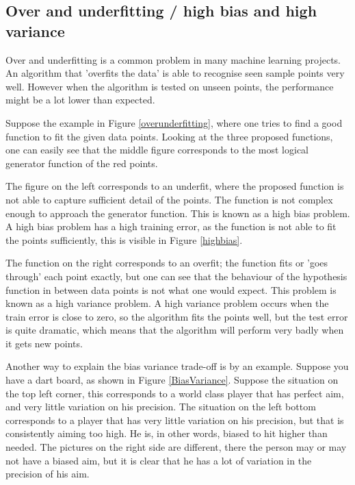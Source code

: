 \subsection{Over and underfitting / high bias and high variance}

Over and underfitting is a common problem in many machine learning projects\citep{prml}. An algorithm that 'overfits the data' is able to recognise seen sample points very well. However when the algorithm is tested on unseen points, the performance might be a lot lower than expected.


Suppose the example in Figure \ref{overunderfitting}, where one tries to find a good function to fit the given data points. Looking at the three proposed functions, one can easily see that the middle figure corresponds to the most logical generator function of the red points. 

\npar

The figure on the left corresponds to an underfit, where the proposed function is not able to capture sufficient detail of the points. The function is not complex enough to approach the generator function. This is known as a high bias problem. A high bias problem has a high training error, as the function is not able to fit the points sufficiently, this is visible in Figure \ref{highbias}.


The function on the right corresponds to an overfit; the function fits or 'goes through' each point exactly, but one can see that the behaviour of the hypothesis function in between data points is not what one would expect. This problem is known as a high variance problem. A high variance problem occurs when the train error is close to zero, so the algorithm fits the points well, but the test error is quite dramatic, which means that the algorithm will perform very badly when it gets new points. 


Another way to explain the bias variance trade-off is by an example. Suppose you have a dart board, as shown in Figure \ref{BiasVariance}. Suppose the situation on the top left corner, this corresponds to a world class player that has perfect aim, and very little variation on his precision. The situation on the left bottom corresponds to a player that has very little variation on his precision, but that is consistently aiming too high. He is, in other words, biased to hit higher than needed. The pictures on the right side are different, there the person may or may not have a biased aim, but it is clear that he has a lot of variation in the precision of his aim.

